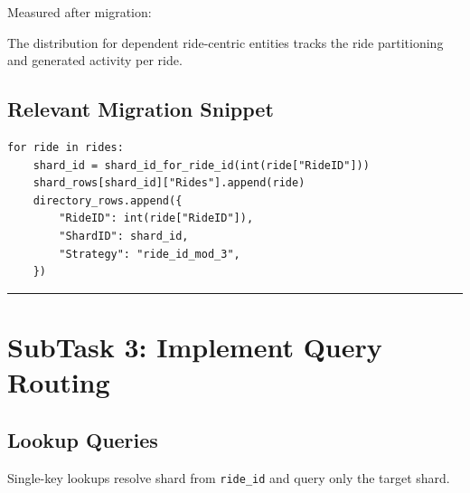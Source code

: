 \documentclass[12pt]{article}
\begin{document}
Measured after migration:

\begin{table}[H]
\centering
\begin{minipage}{\textwidth}
\centering
{}
\end{minipage}
\end{table}

The distribution for dependent ride-centric entities tracks the ride partitioning and generated activity per ride.

\subsection{Relevant Migration Snippet}

\begin{verbatim}
for ride in rides:
    shard_id = shard_id_for_ride_id(int(ride["RideID"]))
    shard_rows[shard_id]["Rides"].append(ride)
    directory_rows.append({
        "RideID": int(ride["RideID"]),
        "ShardID": shard_id,
        "Strategy": "ride_id_mod_3",
    })
\end{verbatim}

\hrule
\vspace{0.75em}

\section{SubTask 3: Implement Query Routing}

\subsection{Lookup Queries}

Single-key lookups resolve shard from \texttt{ride\_id} and query only the target shard.
\end{document}
